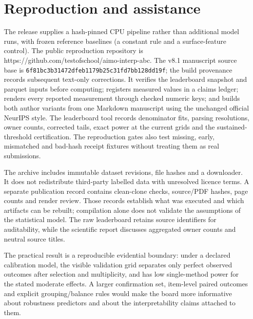\section{Reproduction and assistance}

The release supplies a hash-pinned CPU pipeline rather than additional model runs, with frozen reference baselines (a constant rule and a surface-feature control). The public reproduction repository is https://github.com/testofschool/aimo-interp-abc. The v8.1 manuscript source base is \texttt{6f81bc3b\allowbreak{}31472dfe\allowbreak{}b1179b25\allowbreak{}c31fd7bb\allowbreak{}128dd19f}; the build provenance records subsequent text-only corrections. It verifies the leaderboard snapshot and parquet inputs before computing; registers measured values in a claims ledger; renders every reported measurement through checked numeric keys; and builds both author variants from one Markdown manuscript using the unchanged official NeurIPS style. The leaderboard tool records denominator fits, parsing resolutions, owner counts, corrected tails, exact power at the current grids and the sustained-threshold certification. The reproduction gates also test missing, early, mismatched and bad-hash receipt fixtures without treating them as real submissions.


The archive includes immutable dataset revisions, file hashes and a downloader. It does not redistribute third-party labelled data with unresolved licence terms. A separate publication record contains clean-clone checks, source/PDF hashes, page counts and render review. Those records establish what was executed and which artifacts can be rebuilt; compilation alone does not validate the assumptions of the statistical model. The raw leaderboard retains source identifiers for auditability, while the scientific report discusses aggregated owner counts and neutral source titles.


The practical result is a reproducible evidential boundary: under a declared calibration model, the visible validation grid separates only perfect observed outcomes after selection and multiplicity, and has low single-method power for the stated moderate effects. A larger confirmation set, item-level paired outcomes and explicit grouping/balance rules would make the board more informative about robustness predictors and about the interpretability claims attached to them.


